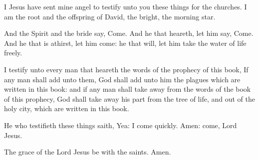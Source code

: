  I Jesus have sent mine angel to testify unto you these things for the churches. I am the root and the offspring of David, the bright, the morning star.

 And the Spirit and the bride say, Come. And he that heareth, let him say, Come. And he that is athirst, let him come: he that will, let him take the water of life freely.

 I testify unto every man that heareth the words of the prophecy of this book, If any man shall add unto them, God shall add unto him the plagues which are written in this book: 
 and if any man shall take away from the words of the book of this prophecy, God shall take away his part from the tree of life, and out of the holy city, which are written in this book.

 He who testifieth these things saith, Yea: I come quickly. Amen: come, Lord Jesus.

 The grace of the Lord Jesus be with the saints. Amen.
